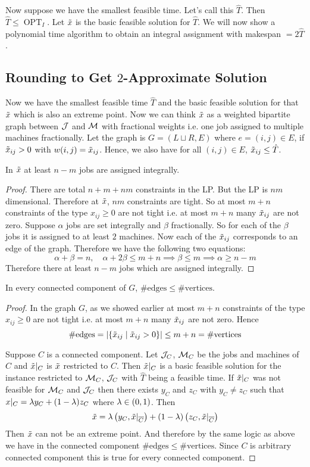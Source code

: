 Now suppose we have the smallest feasible time. Let's call this $\hat{T}$. Then $\hat{T}\leq \operatorname{OPT}_I$. Let $\tilde{x}$ is the basic feasible solution for $\hat{T}$. We will now show a polynomial time algorithm to obtain an integral assignment with makespan $=2\hat{T}$.

\subsection{Rounding to Get \texorpdfstring{$2$}{2}-Approximate Solution}
Now we have the smallest feasible time $\hat{T}$ and the basic feasible solution for that $\tilde{x}$ which is also an extreme point. Now we can think $\tilde{x}$ as a weighted bipartite graph between $\mathcal{J}$ and $\mathcal{M}$ with fractional weights i.e. one job assigned to multiple machines fractionally. Let the graph is $G=(L\sqcup R,E)$ where $e=(i,j)\in E$, if $\tilde{x}_{ij}>0$ with $w(i,j)=\tilde{x}_{ij}$. Hence, we also have for all $(i,j)\in E$, $\tilde{x}_{ij}\leq \hat{T}$. 
\begin{lemma}{}{}
	In $\tilde{x}$ at least $n-m$ jobs are assigned integrally.
\end{lemma}
\begin{proof}
	There are total $n+m+nm$ constraints in the LP. But the LP is $nm$ dimensional. Therefore at $\tilde{x}$, $nm$ constraints are tight. So at most $m+n$ constraints of the type $x_{ij}\geq 0$ are not tight i.e.  at most $m+n$ many $\tilde{x}_{ij}$ are not zero. Suppose $\alpha$ jobs are set integrally and $\beta $ fractionally. So for each of the $\beta $ jobs it is assigned to at least  $2$ machines. Now each of the $\tilde{x}_{ij}$ corresponds to an edge of the graph. Therefore we have the following two equations:$$\alpha+\beta=n,\quad \alpha+2\beta\leq m+n\implies \beta\leq m\implies \alpha\geq n-m$$Therefore there at least $n-m$ jobs which are assigned integrally.
\end{proof}
\begin{lemma}{}{}
	In every connected component of $G$, $\#\text{edges}\leq \#\text{vertices}$.
\end{lemma}
\begin{proof}
	In the graph $G$, as we showed earlier at most $m+n$ constraints of the type $x_{ij}\geq 0$ are not tight i.e.  at most $m+n$ many $\tilde{x}_{ij}$ are not zero. Hence $$\#\text{edges}=|\{\tilde{x}_{ij}\mid \tilde{x}_{ij}>0\}|\leq m+n=\#\text{vertices}$$

	Suppose $C$ is a connected component. Let $\mathcal{J}_C$, $\mathcal{M}_C$ be the jobs and machines of $C$ and $\tilde{x}|_C$ is $\tilde{x}$ restricted to $C$. Then $\tilde{x}|_C$ is a basic feasible solution for the instance restricted to $\mathcal{M}_C$, $\mathcal{J}_C$ with $\hat{T}$ being a feasible time. If $\tilde{x}|_C$ was not feasible for $\mathcal{M}_C$ and $\mathcal{J}_C$ then there exists $y_C$ and $z_C$ with $y_C\neq z_C$ such that $x|_C=\lambda y_C+(1-\lambda)z_C$ where $\lambda\in(0,1)$. Then $$\tilde{x}=\lambda\left(y_C,\tilde{x}|_{\overline{C}}\right)+(1-\lambda)\left(z_C,\tilde{x}|_{\overline{C}}\right)$$ Then $\tilde{x}$ can not be an extreme point. And therefore by the same logic as above we have in the connected component $\#\text{edges}\leq \#\text{vertices}$. Since $C$ is arbitrary connected component this is true for every connected component.
\end{proof}
 
